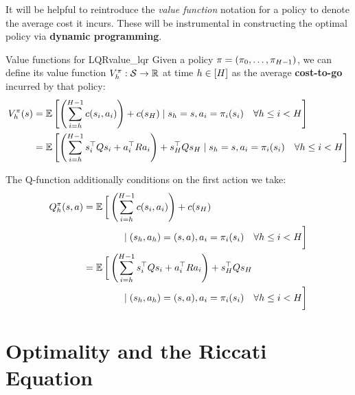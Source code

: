\documentclass[\main/main]{subfiles}
\begin{document}
It will be helpful to reintroduce the \emph{value function} notation for a policy to denote the average cost it incurs.
These will be instrumental in constructing the optimal policy via \textbf{dynamic programming}.

\begin{definition}{Value functions for LQR}{value_lqr}
    Given a policy $\mathbf{\pi} = (\pi_0, \dots, \pi_{H-1})$, we can define its
    value function $V^\pi_h : \mathcal{S} \to \mathbb{R}$ at time $h \in [H]$ as the average \textbf{cost-to-go} incurred by that policy:
    \[
        \begin{split}
            V^\pi_h (s) &= \operatorname*{\mathbb{E}} \left[ \left( \sum_{i=h}^{H-1} c(s_i, a_i) \right) + c(s_H) \mid s_h = s,  a_i = \pi_i(s_i) \quad \forall h \le i < H \right] \\
            &= \operatorname*{\mathbb{E}} \left[ \left( \sum_{i=h}^{H-1} s_i^\top Q s_i + a_i^\top R a_i \right) + s_H^\top Q s_H \mid s_h = s, a_i = \pi_i(s_i) \quad \forall h \le i < H \right] \\
        \end{split}
    \]

    The Q-function additionally conditions on the first
    action we take:
    \[
        \begin{split}
            Q^\pi_h (s, a) &= \operatorname*{\mathbb{E}} \bigg[ \left( \sum_{i=h}^{H-1} c(s_i, a_i) \right) + c(s_H) \\
                &\qquad\qquad \mid  (s_h, a_h) = (s, a), a_i = \pi_i(s_i) \quad \forall h \le i < H \bigg] \\
            &= \operatorname*{\mathbb{E}} \bigg[ \left( \sum_{i=h}^{H-1} s_i^\top Q s_i + a_i^\top R a_i \right) + s_H^\top Q s_H \\
                &\qquad\qquad \mid (s_h, a_h) = (s, a), a_i = \pi_i(s_i) \quad \forall h \le i < H \bigg] \\
        \end{split}
    \]
\end{definition}


\section{Optimality and the Riccati Equation} \label{sec:optimal_lqr}
\end{document}
